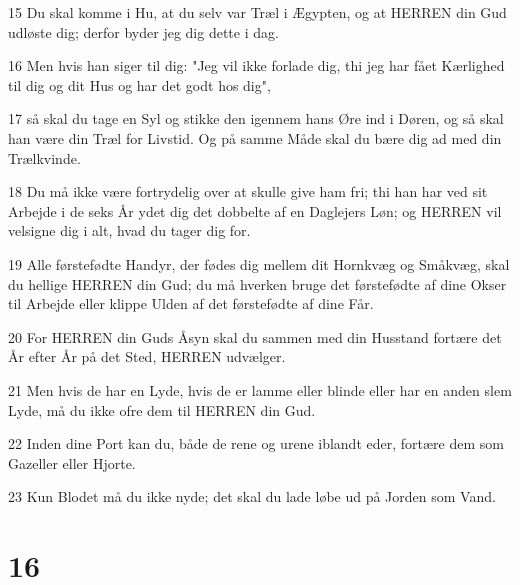 \par 15 Du skal komme i Hu, at du selv var Træl i Ægypten, og at HERREN din Gud udløste dig; derfor byder jeg dig dette i dag.
\par 16 Men hvis han siger til dig: "Jeg vil ikke forlade dig, thi jeg har fået Kærlighed til dig og dit Hus og har det godt hos dig",
\par 17 så skal du tage en Syl og stikke den igennem hans Øre ind i Døren, og så skal han være din Træl for Livstid. Og på samme Måde skal du bære dig ad med din Trælkvinde.
\par 18 Du må ikke være fortrydelig over at skulle give ham fri; thi han har ved sit Arbejde i de seks År ydet dig det dobbelte af en Daglejers Løn; og HERREN vil velsigne dig i alt, hvad du tager dig for.
\par 19 Alle førstefødte Handyr, der fødes dig mellem dit Hornkvæg og Småkvæg, skal du hellige HERREN din Gud; du må hverken bruge det førstefødte af dine Okser til Arbejde eller klippe Ulden af det førstefødte af dine Får.
\par 20 For HERREN din Guds Åsyn skal du sammen med din Husstand fortære det År efter År på det Sted, HERREN udvælger.
\par 21 Men hvis de har en Lyde, hvis de er lamme eller blinde eller har en anden slem Lyde, må du ikke ofre dem til HERREN din Gud.
\par 22 Inden dine Port kan du, både de rene og urene iblandt eder, fortære dem som Gazeller eller Hjorte.
\par 23 Kun Blodet må du ikke nyde; det skal du lade løbe ud på Jorden som Vand.

\chapter{16}

